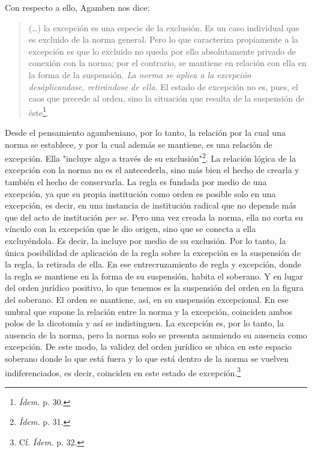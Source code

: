 \documentclass{book}
\begin{document}
Con respecto a ello, Agamben nos dice:

\begin{quote}
(\dots) la excepción es una especie de la exclusión. Es un caso
individual que es excluido de la norma general. Pero lo que caracteriza
propiamente a la excepción es que lo excluido no queda por ello
absolutamente privado de conexión con la norma; por el contrario, se
mantiene en relación con ella en la forma de la suspensión. \emph{La
norma se aplica a la excepción desáplicandose, retirándose de ella}. El
estado de excepción no es, pues, el caos que precede al orden, sino la
situación que resulta de la suspensión de éste\footnote{\emph{Ídem.} p.
  30.}.
\end{quote}

Desde el pensamiento agambeniano, por lo tanto, la relación por la cual
una norma se establece, y por la cual además se mantiene, es una
relación de excepción. Ella "incluye algo a través de su
exclusión"\footnote{\emph{Ídem.} p. 31.}. La relación lógica de la
excepción con la norma no es el antecederla, sino más bien el hecho de
crearla y también el hecho de conservarla. La regla es fundada por medio
de una excepción, ya que su propia institución como orden es posible
solo en una excepción, es decir, en una instancia de institución radical
que no depende más que del acto de institución \emph{per se}. Pero una
vez creada la norma, ella no corta su vínculo con la excepción que le
dio origen, sino que se conecta a ella excluyéndola. Es decir, la
incluye por medio de su exclusión. Por lo tanto, la única posibilidad de
aplicación de la regla sobre la excepción es la suspensión de la regla,
la retirada de ella. En ese entrecruzamiento de regla y excepción, donde
la regla se mantiene en la forma de su suspensión, habita el soberano. Y
en lugar del orden jurídico positivo, lo que tenemos es la suspensión
del orden en la figura del soberano. El orden se mantiene, así, en su
suspensión excepcional. En ese umbral que supone la relación entre la
norma y la excepción, coinciden ambos polos de la dicotomía y así se
indistinguen. La excepción es, por lo tanto, la ausencia de la norma,
pero la norma solo se presenta asumiendo su ausencia como excepción. De
este modo, la validez del orden jurídico se ubica en este espacio
soberano donde lo que está fuera y lo que está dentro de la norma se
vuelven indiferenciados, es decir, coinciden en este estado de
excepción.\footnote{Cf. \emph{Ídem.} p. 32.}
\end{document}
